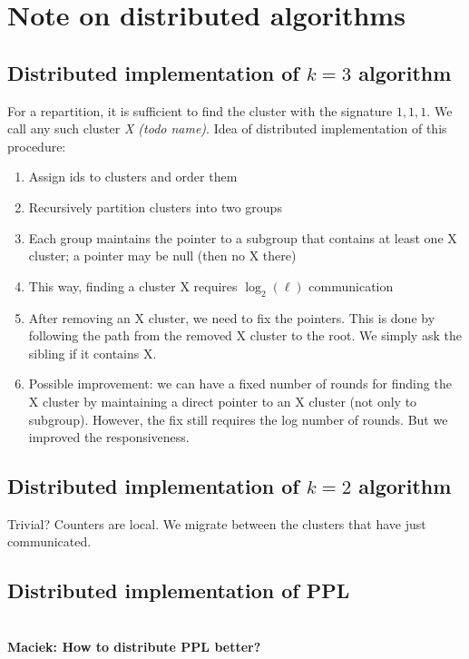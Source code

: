 \documentclass[manuscript,screen=true, review, anonymous]{acmart}
\newcommand\maciek[1]{\color{brown}\textbf{\\ Maciek: #1}\color{black}}
\begin{document}
\section{Note on distributed algorithms}


\subsection{Distributed implementation of $k=3$ algorithm}

For a repartition, it is sufficient to find the cluster with the signature $1,1,1$. 
We call any such cluster \emph{X (todo name)}.
Idea of distributed implementation of this procedure:
\begin{enumerate}
	\item Assign ids to clusters and order them
	\item Recursively partition clusters into two groups
	\item Each group maintains the pointer to a subgroup that contains at least one X cluster; a pointer may be null (then no X there)
	\item This way, finding a cluster X requires $\log_2(\ell)$ communication
	\item After removing an X cluster, we need to fix the pointers. This is done by following the path from the removed X cluster to the root. We simply ask the sibling if it contains X.
	\item Possible improvement: we can have a fixed number of rounds for finding the X cluster by maintaining a direct pointer to an X cluster (not only to subgroup). However, the fix still requires the log number of rounds. But we improved the responsiveness.
\end{enumerate}

\subsection{Distributed implementation of $k=2$ algorithm}

Trivial? Counters are local. We migrate between the clusters that have just communicated.

\subsection{Distributed implementation of PPL}

\maciek{How to distribute PPL better?}


  
\end{document}
